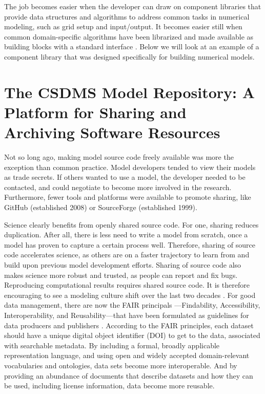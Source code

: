 \documentclass{article} %
\begin{document}
The job becomes easier when the developer can draw on component libraries that provide data structures and algorithms to address common tasks in numerical modeling, such as grid setup and input/output. It becomes easier still when common domain-specific algorithms have been librarized and made available as building blocks with a standard interface \citep[e.g.,][]{brown2014run}. Below we will look at an example of a component library that was designed specifically for building numerical models.



\section{The CSDMS Model Repository: A Platform for Sharing and Archiving Software Resources}
\label{sec:repo}

Not so long ago, making model source code freely available was more the exception than common practice. Model developers tended to view their models as trade secrets. If others wanted to use a model, the developer needed to be contacted, and could negotiate to become more involved in the research. Furthermore, fewer tools and platforms were available to promote sharing, like GitHub (established 2008) or SourceForge (established 1999).

Science clearly benefits from openly shared source code. For one, sharing reduces duplication. After all, there is less need to write a model from scratch, once a model has proven to capture a certain process well. Therefore, sharing of source code accelerates science, as others are on a faster trajectory to learn from and build upon previous model development efforts. Sharing of source code also makes science more robust and trusted, as people can report and fix bugs. Reproducing computational results requires shared source code. It is therefore encouraging to see a modeling culture shift over the last two decades \citep[e.g.,][]{hsu2015data}. For good data management, there are now the FAIR principals ---Findability, Accessibility, Interoperability, and Reusability---that have been formulated as guidelines for data producers and publishers \citep{wilkinson2016fair}. According to the FAIR principles, each dataset should have a unique digital object identifier (DOI) to get to the data, associated with searchable metadata. By including a formal, broadly applicable representation language, and using open and widely accepted domain-relevant vocabularies and ontologies, data sets become more interoperable. And by providing an abundance of documents that describe datasets and how they can be used, including license information, data become more reusable.
\end{document}
